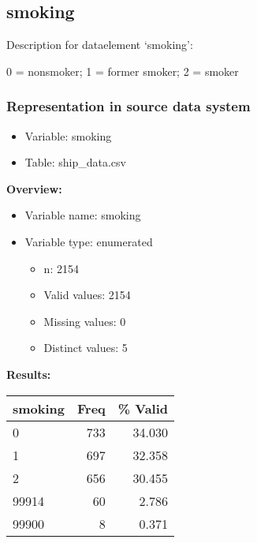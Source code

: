 \documentclass[
]{article}
\providecommand{\tightlist}{%
  \setlength{\itemsep}{0pt}\setlength{\parskip}{0pt}}
\begin{document}
\newpage

\hypertarget{smoking}{%
\subsection{smoking}\label{smoking}}

Description for dataelement `smoking':

0 = nonsmoker; 1 = former smoker; 2 = smoker

\hypertarget{representation-in-source-data-system-25}{%
\subsubsection{\texorpdfstring{Representation in \textbf{source} data
system}{Representation in source data system}}\label{representation-in-source-data-system-25}}

\begin{itemize}
\tightlist
\item
  Variable: smoking
\item
  Table: ship\_data.csv
\end{itemize}

\textbf{Overview:}

\begin{itemize}
\tightlist
\item
  Variable name: smoking
\item
  Variable type: enumerated

  \begin{itemize}
  \tightlist
  \item
    n: 2154
  \item
    Valid values: 2154
  \item
    Missing values: 0
  \item
    Distinct values: 5
  \end{itemize}
\end{itemize}

\textbf{Results:}\\

\begin{table}[H]
\centering
\begin{tabular}{l|r|r}
\hline
\textbf{smoking} & \textbf{Freq} & \textbf{\% Valid}\\
\hline
0 & 733 & 34.030\\
\hline
1 & 697 & 32.358\\
\hline
2 & 656 & 30.455\\
\hline
99914 & 60 & 2.786\\
\hline
99900 & 8 & 0.371\\
\hline
\end{tabular}
\end{table}
\end{document}
